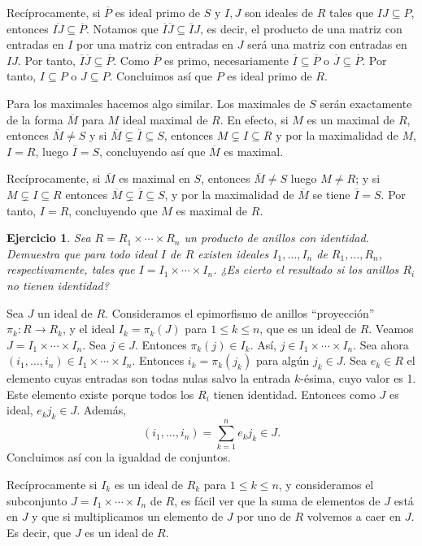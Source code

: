 \documentclass[11pt]{book}
\newtheorem{ej}{Ejercicio}
\theoremstyle{definition}
\begin{document}
Recíprocamente, si $\overline P$ es ideal primo de $S$ y $I,J$ son ideales de $R$ tales que $IJ\subseteq P$, entonces $\overline{IJ}\subseteq\overline P$. Notamos que $\overline I\overline J\subseteq \overline IJ$, es decir, el producto de una matriz con entradas en $I$ por una matriz con entradas en $J$ será una matriz con entradas en $IJ$. Por tanto, $\overline I\overline J\subseteq \overline P$. Como $\overline P$ es primo, necesariamente $\overline I\subseteq\overline P$ o $\overline J\subseteq\overline P$. Por tanto, $I\subseteq P$ o $J\subseteq P$. Concluimos así que $P$ es ideal primo de $R$.

Para los maximales hacemos algo similar. Los maximales de $S$ serán exactamente de la forma $\overline M$ para $M$ ideal maximal de $R$. En efecto, si $M$ es un maximal de $R$, entonces $\overline M\neq S$ y si $\overline M\subsetneq \overline I\subseteq S$, entonces $M\subsetneq I\subseteq R$ y por la maximalidad de $M$, $I=R$, luego $\overline I=S$, concluyendo así que $\overline M$ es maximal.

Recíprocamente, si $\overline M$ es maximal en $S$, entonces $\overline M\neq S$ luego $M\neq R$; y si $M\subsetneq I\subseteq R$ entonces $\overline M\subsetneq \overline I\subseteq S$, y por la maximalidad de $\overline M$ se tiene $\overline I=S$. Por tanto, $I=R$, concluyendo que $M$ es maximal de $R$.

\begin{ej}
    Sea $R=R_1\times\cdots\times R_n$ un producto de anillos con identidad. Demuestra que para todo ideal $I$ de $R$ existen ideales $I_1,\dots,I_n$ de $R_1,\dots,R_n$, respectivamente, tales que $I=I_1\times\cdots\times I_n$. ¿Es cierto el resultado si los anillos $R_i$ no tienen identidad?
\end{ej}
Sea $J$ un ideal de $R$. Consideramos el epimorfismo de anillos ``proyección'' $\pi_k:R\longrightarrow R_k$, y el ideal $I_k=\pi_k(J)$ para $1\leq k\leq n$, que es un ideal de $R$. Veamos $J=I_1\times\cdots\times I_n$. Sea $j\in J$. Entonces $\pi_k(j)\in I_k$. Así, $j\in I_1\times\cdots\times I_n$. Sea ahora $(i_1,\dots,i_n)\in I_1\times\cdots\times I_n$. Entonces $i_k=\pi_k(j_k)$ para algún $j_k\in J$. Sea $e_k\in R$ el elemento cuyas entradas son todas nulas salvo la entrada $k$-ésima, cuyo valor es 1. Este elemento existe porque todos los $R_i$ tienen identidad. Entonces como $J$ es ideal, $e_kj_k\in J$. Además,\[
(i_1,\dots,i_n)=\sum_{k=1}^n e_kj_k\in J.
\]Concluimos así con la igualdad de conjuntos.

Recíprocamente si $I_k$ es un ideal de $R_k$ para $1\leq k\leq n$, y consideramos el subconjunto $J=I_1\times\cdots\times I_n$ de $R$, es fácil ver que la suma de elementos de $J$ está en $J$ y que si multiplicamos un elemento de $J$ por uno de $R$ volvemos a caer en $J$. Es decir, que $J$ es un ideal de $R$.
\end{document}
